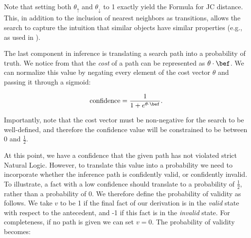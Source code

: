 Note that setting both $\theta_\uparrow$ and $\theta_\downarrow$ to 1 exactly
  yield the Formula  for JC distance.
This, in addition to the inclusion of nearest neighbors as transitions,
  allows the search to capture the intuition that similar objects
  have similar properties
  (e.g., as used in ).
%

%
%
The last component in inference is translating a search path into a
  probability of truth.
We notice from  that the \textit{cost}
  of a path can be represented as $\theta \cdot \bef$.
We can normalize this value by negating every element of the cost
  vector $\theta$ and passing it through a sigmoid:

\vspace{-0.5em}
\begin{equation*}
\textrm{confidence} = \frac{1}{1 + e^{\theta \cdot \bef}}.
\end{equation*}
\vspace{-0.5em}

Importantly, note that the cost vector must be non-negative for the
  search to be well-defined, and therefore the confidence value will
  be constrained to be between 0 and $\frac{1}{2}$.

At this point, we have a confidence that the given path has not violated
  strict Natural Logic.
However, to translate this value into a probability
  we need to incorporate whether the inference path is
  confidently valid, or confidently invalid.
To illustrate, a fact with a low confidence should translate to a
  probability of $\frac{1}{2}$, rather than a probability of 0.
We therefore define the probability of validity as follows.
We take $v$ to be 1 if the final fact of our derivation is in the
  \textit{valid} state with respect to the antecedent,
  and -1 if this fact is in the \textit{invalid} state.
For completeness, if no path is given we can set $v=0$.
The probability of validity becomes:

